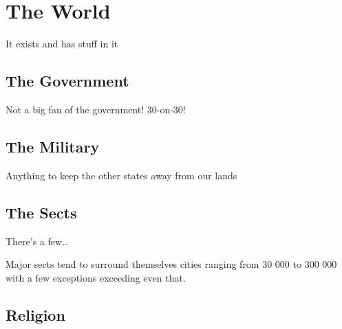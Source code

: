 \section{The World}
It exists and has stuff in it

\subsection{The Government}

Not a big fan of the government! 30-on-30!


\subsection{The Military}

Anything to keep the other states away from our lands

\subsection{The Sects}

There's a few\dots

Major sects tend to surround themselves cities ranging from 30 000 to 300 000 with a few exceptions exceeding even that.

\subsection{Religion}




